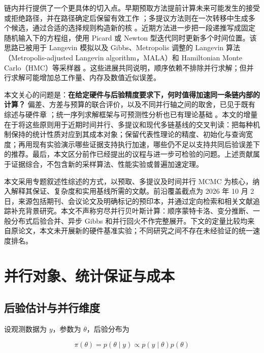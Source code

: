 \documentclass[UTF8,a4paper,zihao=-4,fontset=fandol]{ctexart}
\begin{document}
链内并行提供了一个更具体的切入点。早期预取方法提前计算未来可能发生的接受或拒绝路径，并在路径确定后保留有效工作 \cite{brockwell2006,angelino2014}；多提议方法则在一次转移中生成多个候选，通过合适的选择规则构造新的核 \cite{calderhead2014,glattholtz2024}。近期方法进一步把一段递推写成固定随机输入下的方程组，使用 Picard 或 Newton 型迭代同时更新多个时间位置。该思路已被用于 Langevin 模拟以及 Gibbs、Metropolis 调整的 Langevin 算法（Metropolis-adjusted Langevin algorithm，MALA）和 Hamiltonian Monte Carlo（HMC）等采样器 \cite{anari2024,zoltowski2025,grazzi2026}。这些进展共同说明，顺序依赖不排除并行求解；但并行求解可能增加总工作量、内存及数值近似误差。

本文关心的问题是：\textbf{在给定硬件与后验精度要求下，何时值得加速同一条链内部的计算？} 偏差、方差与预算的联合评价，以及不同并行轴之间的取舍，已见于既有综述与硬件章 \cite{angelino2016,sountsov2026}；统一序列求解框架与可预测性分析也已有理论基础 \cite{gonzalez2026,gonzalez2025predict}。本文的增量在于将这些原则用于近期时间并行、多提议和现代多链基线的交叉判读：把每种机制保持的统计性质对应到其成本对象；保留代表性理论的精度、初始化与查询宽度；再用现有实验演示哪些证据支持执行加速，哪些仍不足以支持共同后验误差下的推荐。最后，本文区分前作已经提出的议程与进一步可检验的问题。上述贡献属于证据综合，不包含新的采样算法、性能实验或普遍加速定理。

本文采用专题叙述性综述的方式，以预取、多提议及时间并行 MCMC 为核心，纳入解释其保证、复杂度和实用基线所需的文献。前沿覆盖截点为 2026 年 10 月 2 日，来源包括期刊、会议论文及明确标记的预印本，并通过定向检索和相关文献追踪补充背景研究。本文不声称穷尽并行贝叶斯计算：顺序蒙特卡洛、变分推断、一般分布式后验合并、异步 Gibbs 和并行回火不作完整展开。下文的定量比较均来自原论文，本文未开展新的硬件基准实验；不同研究之间不存在未经验证的统一速度排名。

\section{并行对象、统计保证与成本}

\subsection{后验估计与并行维度}

设观测数据为 $y$，参数为 $\theta$，后验分布为

\begin{equation}
\pi(\theta)=p(\theta\mid y)\propto p(y\mid\theta)p(\theta)
\label{eq:1}
\end{equation}
\end{document}
